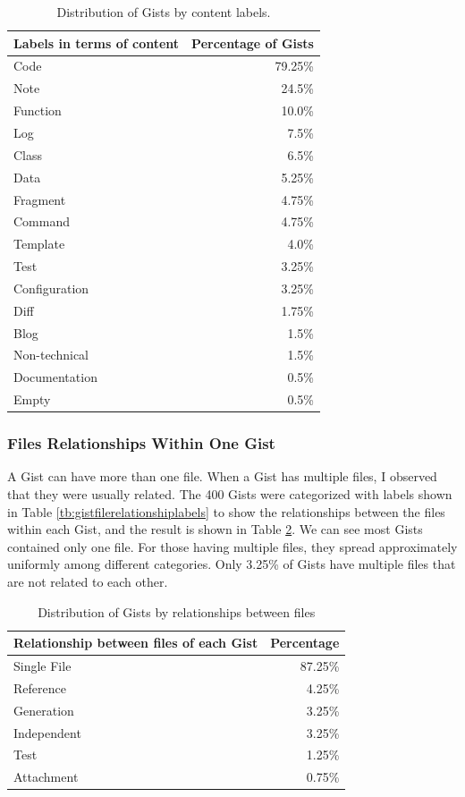 \begin{table}[!htb]
 \begin{center}
 \begin{tabular}{@{}lr} \hline
    \textbf{Labels in terms of content}	&	\textbf{Percentage of Gists} \\ \hline
	Code & 79.25\%\\
	Note & 24.5\%\\
	Function & 10.0\%\\
	Log & 7.5\%\\
	Class & 6.5\%\\
	Data & 5.25\%\\
	Fragment & 4.75\%\\
	Command & 4.75\%\\
	Template & 4.0\%\\
	Test & 3.25\%\\
	Configuration & 3.25\%\\
	Diff & 1.75\%\\
	Blog & 1.5\%\\
	Non-technical & 1.5\%\\
	Documentation & 0.5\%\\
	Empty & 0.5\%\\ \hline
 \end{tabular}
 \end{center}
 \caption{Distribution of Gists by content labels.}
 \label{tb:labels}
\end{table}

\subsubsection{Files Relationships Within One Gist}
A Gist can have more than one file. When a Gist has multiple files, I observed that they were usually related. The 400 Gists were categorized with labels shown in Table \ref{tb:gistfilerelationshiplabels} to show the relationships between the files within each Gist, and the result is shown in Table \ref{tb:relationship}. We can see most Gists contained only one file. For those having multiple files, they spread approximately uniformly among different categories. Only 3.25\% of Gists have multiple files that are not related to each other. 

\begin{table}[!htb]
 \begin{center}
 \begin{tabular}{lr}
    \textbf{Relationship between files of each Gist}	&	\textbf{Percentage} \\ \hline
	Single File & 87.25\%\\
	Reference & 4.25\%\\
	Generation & 3.25\%\\
	Independent & 3.25\%\\
	Test & 1.25\%\\
	Attachment & 0.75\%\\ \hline
 \end{tabular}
 \end{center}
 \caption{Distribution of Gists by relationships between files}
 \label{tb:relationship}
\end{table}